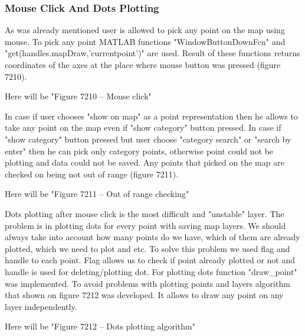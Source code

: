 		\subsubsection{Mouse Click And Dots Plotting}
		As was already mentioned user is allowed to pick any point on the map using mouse. To pick any point MATLAB functions "WindowButtonDownFcn" and "get(handles.mapDraw,'currentpoint')" are used. Result of these functions returns coordinates of the axes at the place where mouse button was pressed (figure 7210). 
		
		Here will be "Figure 7210 – Mouse click"
		
		In case if user chooses "show on map" as a point representation then he allows to take any point on the map even if "show category" button pressed. In case if "show category" button pressed but user choose "category search" or "search by enter" then he can pick only category points, otherwise point could not be plotting and data could not be saved. Any points that picked on the map are checked on being not out of range (figure 7211).
		
		Here will be "Figure 7211 – Out of range checking"
		
		Dots plotting after mouse click is the most difficult and "unstable" layer. The problem is in plotting dots for every point with saving map layers. We should always take into account how many points do we have, which of them are already plotted, which we need to plot and etc. 
		To solve this problem we used flag and handle to each point. Flag allows us to check if point already plotted or not and handle is used for deleting/plotting dot. For plotting dots function "draw\_point" was implemented. 
		To avoid problems with plotting points and layers algorithm that shown on figure 7212 was developed. It allows to draw any point on any layer independently.
		
		Here will be "Figure 7212 – Dots plotting algorithm"
